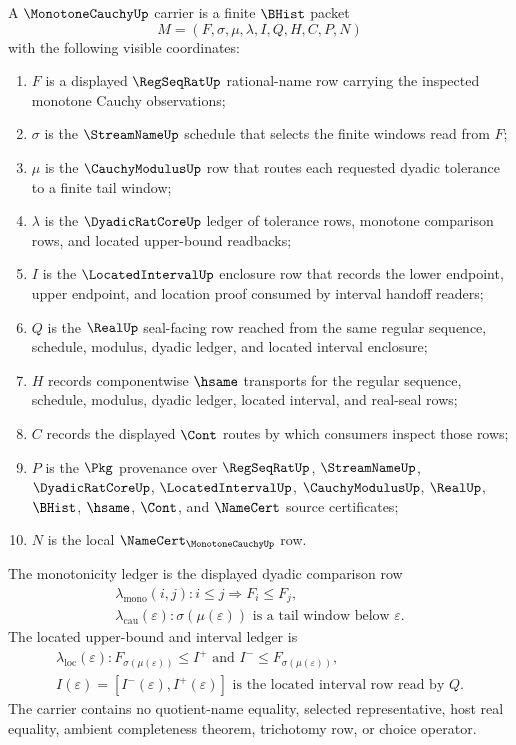 \begin{definition}
\label{def:monotone-cauchy-carrier}
A $\MonotoneCauchyUp$ carrier is a finite $\BHist$ packet
$$
M=(F,\sigma,\mu,\lambda,I,Q,H,C,P,N)
$$
with the following visible coordinates:
\begin{enumerate}
\item $F$ is a displayed $\RegSeqRatUp$ rational-name row carrying the inspected monotone Cauchy observations;
\item $\sigma$ is the $\StreamNameUp$ schedule that selects the finite windows read from $F$;
\item $\mu$ is the $\CauchyModulusUp$ row that routes each requested dyadic tolerance to a finite tail window;
\item $\lambda$ is the $\DyadicRatCoreUp$ ledger of tolerance rows, monotone comparison rows, and located upper-bound readbacks;
\item $I$ is the $\LocatedIntervalUp$ enclosure row that records the lower endpoint, upper endpoint, and location proof consumed by interval handoff readers;
\item $Q$ is the $\RealUp$ seal-facing row reached from the same regular sequence, schedule, modulus, dyadic ledger, and located interval enclosure;
\item $H$ records componentwise $\hsame$ transports for the regular sequence, schedule, modulus, dyadic ledger, located interval, and real-seal rows;
\item $C$ records the displayed $\Cont$ routes by which consumers inspect those rows;
\item $P$ is the $\Pkg$ provenance over $\RegSeqRatUp$, $\StreamNameUp$, $\DyadicRatCoreUp$, $\LocatedIntervalUp$, $\CauchyModulusUp$, $\RealUp$, $\BHist$, $\hsame$, $\Cont$, and $\NameCert$ source certificates;
\item $N$ is the local $\NameCert_{\MonotoneCauchyUp}$ row.
\end{enumerate}
The monotonicity ledger is the displayed dyadic comparison row
$$
\begin{gathered}
\lambda_{\mathrm{mono}}(i,j): i \leq j \Rightarrow F_i \leq F_j,\\
\lambda_{\mathrm{cau}}(\varepsilon): \sigma(\mu(\varepsilon)) \text{ is a tail window below } \varepsilon.
\end{gathered}
$$
The located upper-bound and interval ledger is
$$
\begin{gathered}
\lambda_{\mathrm{loc}}(\varepsilon): F_{\sigma(\mu(\varepsilon))} \leq I^+ \text{ and } I^- \leq F_{\sigma(\mu(\varepsilon))},\\
I(\varepsilon)=[I^-(\varepsilon),I^+(\varepsilon)] \text{ is the located interval row read by } Q.
\end{gathered}
$$
The carrier contains no quotient-name equality, selected representative, host real equality, ambient completeness theorem, trichotomy row, or choice operator.
\end{definition}


